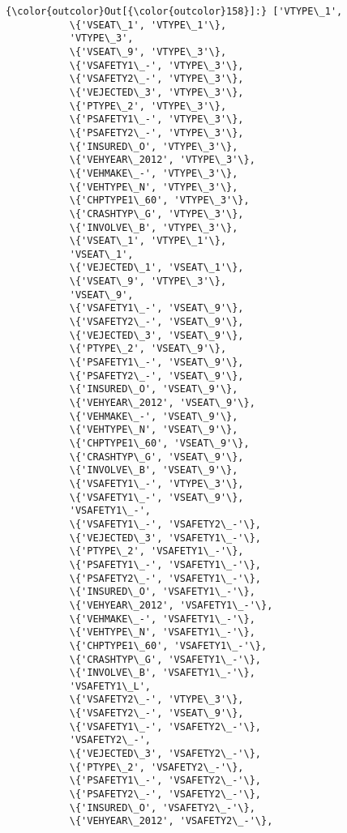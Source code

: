 \documentclass[11pt]{article}
\begin{document}
\begin{Verbatim}[commandchars=\\\{\}]
{\color{outcolor}Out[{\color{outcolor}158}]:} ['VTYPE\_1',
           \{'VSEAT\_1', 'VTYPE\_1'\},
           'VTYPE\_3',
           \{'VSEAT\_9', 'VTYPE\_3'\},
           \{'VSAFETY1\_-', 'VTYPE\_3'\},
           \{'VSAFETY2\_-', 'VTYPE\_3'\},
           \{'VEJECTED\_3', 'VTYPE\_3'\},
           \{'PTYPE\_2', 'VTYPE\_3'\},
           \{'PSAFETY1\_-', 'VTYPE\_3'\},
           \{'PSAFETY2\_-', 'VTYPE\_3'\},
           \{'INSURED\_O', 'VTYPE\_3'\},
           \{'VEHYEAR\_2012', 'VTYPE\_3'\},
           \{'VEHMAKE\_-', 'VTYPE\_3'\},
           \{'VEHTYPE\_N', 'VTYPE\_3'\},
           \{'CHPTYPE1\_60', 'VTYPE\_3'\},
           \{'CRASHTYP\_G', 'VTYPE\_3'\},
           \{'INVOLVE\_B', 'VTYPE\_3'\},
           \{'VSEAT\_1', 'VTYPE\_1'\},
           'VSEAT\_1',
           \{'VEJECTED\_1', 'VSEAT\_1'\},
           \{'VSEAT\_9', 'VTYPE\_3'\},
           'VSEAT\_9',
           \{'VSAFETY1\_-', 'VSEAT\_9'\},
           \{'VSAFETY2\_-', 'VSEAT\_9'\},
           \{'VEJECTED\_3', 'VSEAT\_9'\},
           \{'PTYPE\_2', 'VSEAT\_9'\},
           \{'PSAFETY1\_-', 'VSEAT\_9'\},
           \{'PSAFETY2\_-', 'VSEAT\_9'\},
           \{'INSURED\_O', 'VSEAT\_9'\},
           \{'VEHYEAR\_2012', 'VSEAT\_9'\},
           \{'VEHMAKE\_-', 'VSEAT\_9'\},
           \{'VEHTYPE\_N', 'VSEAT\_9'\},
           \{'CHPTYPE1\_60', 'VSEAT\_9'\},
           \{'CRASHTYP\_G', 'VSEAT\_9'\},
           \{'INVOLVE\_B', 'VSEAT\_9'\},
           \{'VSAFETY1\_-', 'VTYPE\_3'\},
           \{'VSAFETY1\_-', 'VSEAT\_9'\},
           'VSAFETY1\_-',
           \{'VSAFETY1\_-', 'VSAFETY2\_-'\},
           \{'VEJECTED\_3', 'VSAFETY1\_-'\},
           \{'PTYPE\_2', 'VSAFETY1\_-'\},
           \{'PSAFETY1\_-', 'VSAFETY1\_-'\},
           \{'PSAFETY2\_-', 'VSAFETY1\_-'\},
           \{'INSURED\_O', 'VSAFETY1\_-'\},
           \{'VEHYEAR\_2012', 'VSAFETY1\_-'\},
           \{'VEHMAKE\_-', 'VSAFETY1\_-'\},
           \{'VEHTYPE\_N', 'VSAFETY1\_-'\},
           \{'CHPTYPE1\_60', 'VSAFETY1\_-'\},
           \{'CRASHTYP\_G', 'VSAFETY1\_-'\},
           \{'INVOLVE\_B', 'VSAFETY1\_-'\},
           'VSAFETY1\_L',
           \{'VSAFETY2\_-', 'VTYPE\_3'\},
           \{'VSAFETY2\_-', 'VSEAT\_9'\},
           \{'VSAFETY1\_-', 'VSAFETY2\_-'\},
           'VSAFETY2\_-',
           \{'VEJECTED\_3', 'VSAFETY2\_-'\},
           \{'PTYPE\_2', 'VSAFETY2\_-'\},
           \{'PSAFETY1\_-', 'VSAFETY2\_-'\},
           \{'PSAFETY2\_-', 'VSAFETY2\_-'\},
           \{'INSURED\_O', 'VSAFETY2\_-'\},
           \{'VEHYEAR\_2012', 'VSAFETY2\_-'\},

\end{Verbatim}
\end{document}
